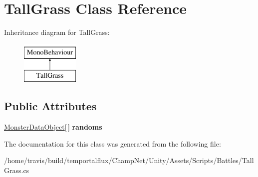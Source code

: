 \hypertarget{class_tall_grass}{\section{Tall\-Grass Class Reference}
\label{class_tall_grass}
}
Inheritance diagram for Tall\-Grass\-:\begin{figure}[H]
\begin{center}
\leavevmode
\includegraphics[height=2.000000cm]{class_tall_grass}
\end{center}
\end{figure}
\subsection*{Public Attributes}
\begin{DoxyCompactItemize}
\item 
\hypertarget{class_tall_grass_a694a979d07a06888b80f8b27ea56953d}{\hyperlink{class_monster_data_object}{Monster\-Data\-Object}\mbox{[}$\,$\mbox{]} {\bfseries randoms}}\label{class_tall_grass_a694a979d07a06888b80f8b27ea56953d}

\end{DoxyCompactItemize}


The documentation for this class was generated from the following file\-:\begin{DoxyCompactItemize}
\item 
/home/travis/build/temportalflux/\-Champ\-Net/\-Unity/\-Assets/\-Scripts/\-Battles/Tall\-Grass.\-cs\end{DoxyCompactItemize}
